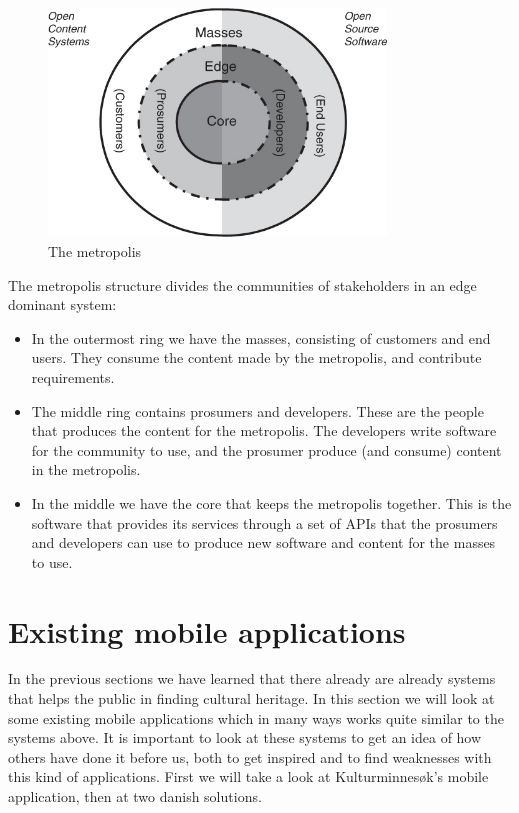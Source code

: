 \documentclass[11pt]{book}
\begin{document}
\begin{figure}[H]
      \centering
      \includegraphics[width=0.8\textwidth]{Figures/Prestudy/metropolis.jpg}
      \caption{The metropolis}
      \label{fig:pre_edgeMetropolis}
\end{figure}

The metropolis structure divides the communities of stakeholders in an edge dominant system:

\begin{itemize}
  \item In the outermost ring we have the masses, consisting of customers and end users. They consume the content made by the metropolis, and contribute requirements.
  \item The middle ring contains prosumers and developers. These are the people that produces the content for the metropolis. The developers write software for the community to use, and the prosumer produce (and consume) content in the metropolis.
  \item In the middle we have the core that keeps the metropolis together. This is the software that provides its services through a set of APIs that the prosumers and developers can use to produce new software and content for the masses to use.
\end{itemize}

\section{Existing mobile applications}
In the previous sections we have learned that there already are already systems that helps the public in finding cultural heritage. In this section we will look at some existing mobile applications which in many ways works quite similar to the systems above. It is important to look at these systems to get an idea of how others have done it before us, both to get inspired and to find weaknesses with this kind of applications. First we will take a look at Kulturminnesøk’s mobile application, then at two danish solutions.
\end{document}
